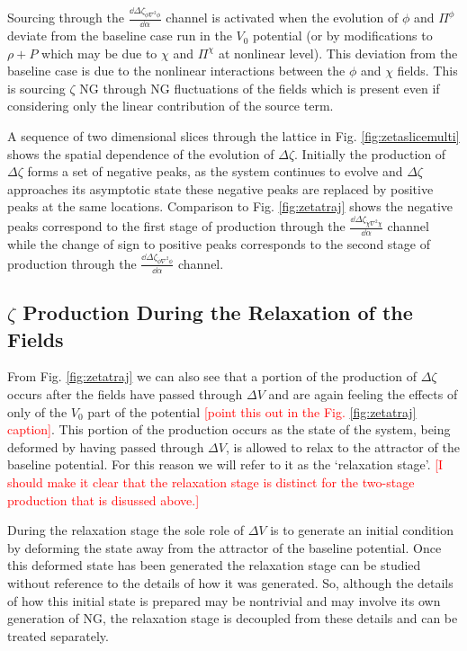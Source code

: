 Sourcing through the $\frac{\dd\Delta\zeta_{\dot{\phi}\nabla^2\phi}}{\dd\alpha}$ channel is activated when the evolution of $\phi$ and $\Pi^\phi$ deviate from the baseline case run in the $V_0$ potential (or by modifications to $\rho + P$ which may be due to $\chi$ and $\Pi^\chi$ at nonlinear level). This deviation from the baseline case is due to the nonlinear interactions between the $\phi$ and $\chi$ fields.
This is sourcing $\zeta$ NG through NG fluctuations of the fields which is present even if considering only the linear contribution of the source term.

\Fzetaslicemulti

A sequence of two dimensional slices through the lattice in Fig. \ref{fig:zetaslicemulti} shows the spatial dependence of the evolution of $\Delta\zeta$. Initially the production of $\Delta\zeta$ forms a set of negative peaks, as the system continues to evolve and $\Delta\zeta$ approaches its asymptotic state these negative peaks are replaced by positive peaks at the same locations. Comparison to Fig. \ref{fig:zetatraj} shows the negative peaks correspond to the first stage of production through the $\frac{\dd\Delta\zeta_{\dot{\chi}\nabla^2\chi}}{\dd\alpha}$ channel while the change of sign to positive peaks corresponds to the second stage of production through the $\frac{\dd\Delta\zeta_{\dot{\phi}\nabla^2\phi}}{\dd\alpha}$ channel.

\subsection{$\zeta$ Production During the Relaxation of the Fields}
From Fig. \ref{fig:zetatraj} we can also see that a portion of the production of $\Delta\zeta$ occurs after the fields have passed through $\Delta V$ and are again feeling the effects of only of the $V_0$ part of the potential \textcolor{red}{[point this out in the Fig. \ref{fig:zetatraj} caption]}. This portion of the production occurs as the state of the system, being deformed by having passed through $\Delta V$, is allowed to relax to the attractor of the baseline potential. For this reason we will refer to it as the `relaxation stage'. \textcolor{red}{[I should make it clear that the relaxation stage is distinct for the two-stage production that is disussed above.]}

During the relaxation stage the sole role of $\Delta V$ is to generate an initial condition by deforming the state away from the attractor of the baseline potential. Once this deformed state has been generated the relaxation stage can be studied without reference to the details of how it was generated. So, although the details of how this initial state is prepared may be nontrivial and may involve its own generation of NG, the relaxation stage is decoupled from these details and can be treated separately.

